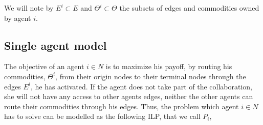 \documentclass[review]{elsarticle}
\begin{document}
We will note by $E^i \subset E$ and $\Theta^i\subset \Theta$ the subsets of
edges and commodities owned by agent $i$.

\subsection{Single agent model}

The objective of an agent $i \in N$ is to maximize his payoff, by routing his
commodities, $\Theta^i$, from their origin nodes to their terminal nodes through the edges $E^i$, he has activated. If the agent does not take part of the collaboration, she will not have any access to other agents edges, neither the other agents can route their commodities through his edges. Thus, the problem which agent $i\in N$ has to solve can be modelled as the following ILP, that we call $P_i$, 
\end{document}
